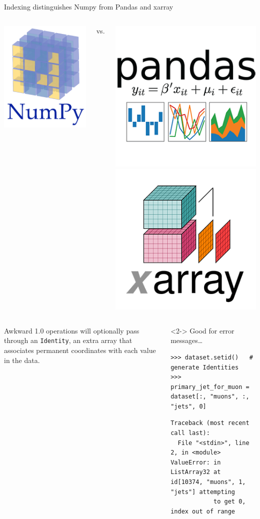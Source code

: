 \documentclass[aspectratio=169]{beamer}
\begin{document}
\begin{frame}[fragile]{Indexing distinguishes Numpy from Pandas and xarray}
\large
\vspace{0.6 cm}
\begin{columns}
\column{1.5 cm}
\includegraphics[height=2 cm]{numpy-logo.png}

\column{0.5 cm}
\centering \huge vs.

\column{4.5 cm}
\includegraphics[height=2 cm]{pandas-logo.png}\hspace{0.5 cm}\includegraphics[height=2 cm]{xarray-logo.png}
\end{columns}

\vspace{0.5 cm}
\begin{columns}
Awkward 1.0 operations will optionally pass through an \texttt{Identity}, an extra array that associates permanent coordinates with each value in the data.

\vspace{0.25 cm}
\begin{uncoverenv}<2->
Good for error messages\ldots

\small
\begin{verbatim}
>>> dataset.setid()   # generate Identities
>>> primary_jet_for_muon = dataset[:, "muons", :, "jets", 0]
\end{verbatim}

\vspace{-0.5 cm}
\begin{verbatim}
Traceback (most recent call last):
  File "<stdin>", line 2, in <module>
ValueError: in ListArray32 at id[10374, "muons", 1, "jets"] attempting
            to get 0, index out of range
\end{verbatim}
\end{uncoverenv}
\end{columns}
\end{frame}
\end{document}
